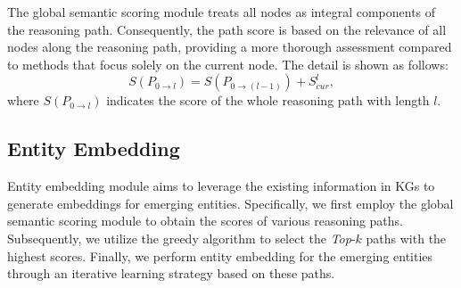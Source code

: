 \documentclass[sigconf]{acmart}
\begin{document}
The global semantic scoring module treats all nodes as integral components of the reasoning path. Consequently, the path score is based on the relevance of all nodes along the reasoning path, providing a more thorough assessment compared to methods that focus solely on the current node. The detail is shown as follows:
\vspace{-3pt}
\begin{equation}
\label{scoring_mechanism}
S(P_{0 \rightarrow l}) =
S(P_{0 \rightarrow(l-1)})+ S_{cur}^l,\nonumber
\end{equation}
where $S(P_{0 \rightarrow l})$ indicates the score of the whole reasoning path with length $l$. 

\subsection{Entity Embedding} 
Entity embedding module aims to leverage the existing information in KGs to generate embeddings for emerging entities. Specifically, we first employ the global semantic scoring module to obtain the scores of various reasoning paths. Subsequently, we utilize the greedy algorithm to select the \textit{Top}-$k$ paths with the highest scores. Finally, we perform entity embedding for the emerging entities through an iterative learning strategy based on these paths.

\end{document}
